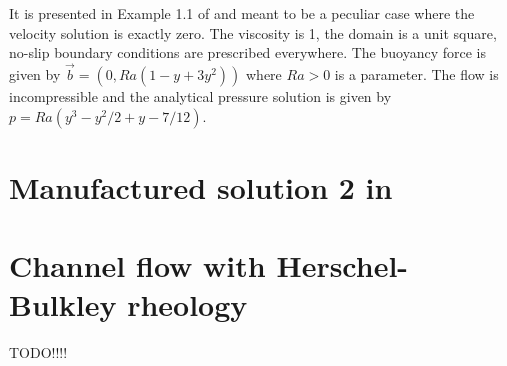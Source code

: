 It is presented in Example 1.1 of \cite{jolm17} and meant to be a peculiar case where the velocity solution 
is exactly zero. The viscosity is 1, the domain is a unit square, no-slip boundary conditions 
are prescribed everywhere. The buoyancy force is given by $\vec{b}=(0,Ra(1-y+3y^2))$ where 
$Ra>0$ is a parameter. The flow is incompressible and the analytical pressure solution 
is given by $p=Ra(y^3-y^2/2+y-7/12)$.

\section{Manufactured solution 2 in \textcite{jolm17}  \label{ss:mms_jolm17}}


\section{Channel flow with Herschel-Bulkley rheology \label{ss:HBflow}}
 TODO!!!!



